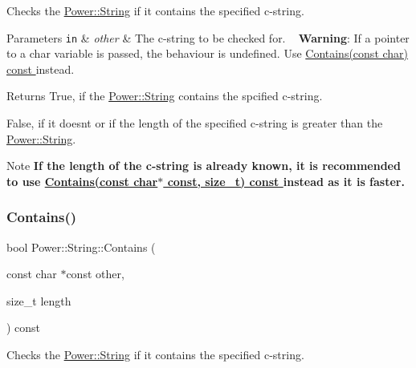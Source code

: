 Checks the \hyperlink{class_power_1_1_string}{Power\+::\+String} if it contains the specified c-\/string. 


\begin{DoxyParams}[1]{Parameters}
\mbox{\tt in}  & {\em other} & The c-\/string to be checked for. ~\newline
 {\bfseries Warning}\+: If a pointer to a char variable is passed, the behaviour is undefined. Use \hyperlink{class_power_1_1_string_a728af5dfae32933d8548a657d7cd2043}{Contains(const char) const }instead. \\
\hline
\end{DoxyParams}
\begin{DoxyReturn}{Returns}
True, if the \hyperlink{class_power_1_1_string}{Power\+::\+String} contains the spcified c-\/string. 

False, if it doesn\textquotesingle{}t or if the length of the specified c-\/string is greater than the \hyperlink{class_power_1_1_string}{Power\+::\+String}. 
\end{DoxyReturn}
\begin{DoxyNote}{Note}
{\bfseries If the length of the c-\/string is already known, it is recommended to use \hyperlink{class_power_1_1_string_a7ed6567e4c08c0b61f415039a665d3ff}{Contains(const char$\ast$ const, size\+\_\+t) const }instead as it is faster.} 
\end{DoxyNote}
\mbox{\label{class_power_1_1_string_a7ed6567e4c08c0b61f415039a665d3ff}} 
\subsubsection{\texorpdfstring{Contains()}{Contains()}\hspace{0.1cm}{\footnotesize\ttfamily [3/4]}}
{\footnotesize\ttfamily bool Power\+::\+String\+::\+Contains (\begin{DoxyParamCaption}\item[{const char $\ast$const}]{other,  }\item[{size\+\_\+t}]{length }\end{DoxyParamCaption}) const\hspace{0.3cm}{\ttfamily [inline]}}



Checks the \hyperlink{class_power_1_1_string}{Power\+::\+String} if it contains the specified c-\/string. 


